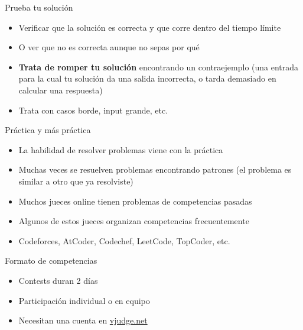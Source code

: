 \documentclass[10pt]{beamer}
\newcommand{\bi}{\begin{itemize}}
\newcommand{\ei}{\end{itemize}}
\begin{document}
\begin{frame}{Prueba tu solución}
    \bi
        \item Verificar que la solución es correcta y que corre dentro del tiempo límite 
        \item O ver que no es correcta aunque no sepas por qué
        \vspace{10pt}
        \item \textbf{Trata de romper tu solución} encontrando un contraejemplo 
        (una entrada para la cual tu solución da una salida incorrecta, 
        o tarda demasiado en calcular una respuesta)
        \item Trata con casos borde, input grande, etc.
    \ei
\end{frame}

\begin{frame}{Práctica y más práctica}
    \bi
        \item La habilidad de resolver problemas viene con la práctica
        \item Muchas veces se resuelven problemas encontrando patrones (el problema es similar a otro que ya resolviste)
        \item Muchos jueces online tienen problemas de competencias pasadas
        \item Algunos de estos jueces organizan competencias frecuentemente
        \item Codeforces, AtCoder, Codechef, LeetCode, TopCoder, etc.
    \ei
\end{frame}

\begin{frame}{Formato de competencias}
    \bi
        \item Contests duran 2 días 
        \item Participación individual o en equipo
        \item Necesitan una cuenta en \alert{\href{https://vjudge.net}{vjudge.net}}
    \ei
\end{frame}
\end{document}
